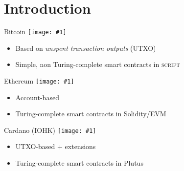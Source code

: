 \section{Introduction}

\newcommand\withLogo[2]{#2 \hfill \texttt{[image: \#1]}}

\begin{frame}[plain] %

\begin{alertblock}{\withLogo{bitcoin}{Bitcoin}}
\begin{itemize}
\item Based on \textit{unspent transaction outputs} (UTXO)
\item Simple, non Turing-complete smart contracts in \textsc{script}
\end{itemize}
\end{alertblock}

\begin{alertblock}{\withLogo{ethereum}{Ethereum}}
\begin{itemize}
\item Account-based
\item Turing-complete smart contracts in Solidity/EVM
\end{itemize}
\end{alertblock}

\begin{alertblock}{\withLogo{ada}{Cardano (IOHK)}}
\begin{itemize}
\item UTXO-based + extensions
\item Turing-complete smart contracts in Plutus
\end{itemize}
\end{alertblock}

\end{frame}

